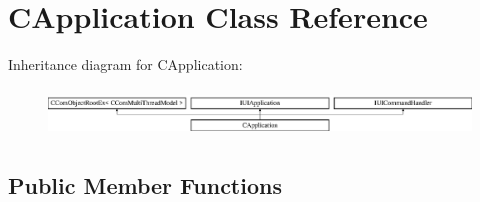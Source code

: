 \hypertarget{class_c_application}{\section{C\-Application Class Reference}
\label{class_c_application}
}
Inheritance diagram for C\-Application\-:\begin{figure}[H]
\begin{center}
\leavevmode
\includegraphics[height=1.287356cm]{class_c_application}
\end{center}
\end{figure}
\subsection*{Public Member Functions}
